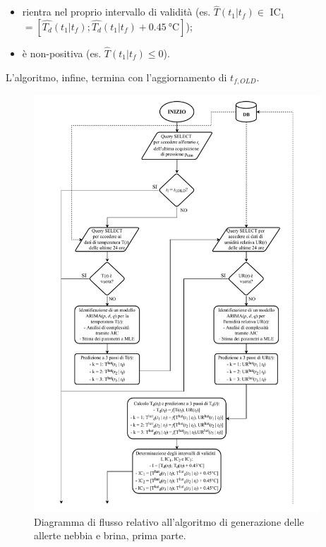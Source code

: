 \begin{itemize}
	\item rientra nel proprio intervallo di validità (es. $\hat{T}(t_1|t_f) \in$ IC$_1$ $= [\hat{T_d}(t_1|t_f);\hat{T_d}(t_1|t_f) + \SI{0.45}{\degreeCelsius}]$);
	\item è non-positiva (es. $\hat{T}(t_1|t_f) \le 0$).
\end{itemize} L'algoritmo, infine, termina con l'aggiornamento di $t_{f,OLD}$.        

\begin{figure}[h!]
	\centering
	\includegraphics[height=590px]{./Iterazione 3/OtherFiles/FC - Generatore allerte F&F(1).pdf}
	\caption{Diagramma di flusso relativo all'algoritmo di generazione delle allerte nebbia e brina, prima parte.}
	\label{fig:FFFlowChart1}
\end{figure}

